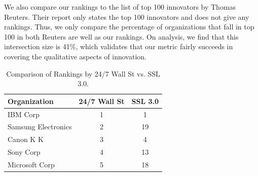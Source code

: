 We also compare our rankings to the list of top 100 innovators by Thomas
Reuters. Their report only states the top 100 innovators and does not give any
rankings. Thus, we only compare the percentage of organizations that fall in
top 100 in both Reuters are well as our rankings. On analysis, we find that
this intersection size is 41\%, which validates that our metric fairly
succeeds in covering the qualitative aspects of innovation.

\begin{table}[h]
\centering
\begin{tabular}{|l|c|c|}
\hline
\textbf{Organization}        & \multicolumn{1}{l|}{\textbf{24/7 Wall St}} & \multicolumn{1}{l|}{\textbf{SSL 3.0}} \\ \hline
IBM Corp                     & 1                                          & 1                                         \\ \hline
Samsung Electronics          & 2                                          & 19                                        \\ \hline
Canon K K                    & 3                                          & 4                                         \\ \hline
Sony Corp                    & 4                                          & 13                                        \\ \hline
Microsoft Corp               & 5                                          & 18                                        \\ \hline
\end{tabular}
\caption{Comparison of Rankings by 24/7 Wall St vs. SSL 3.0.}
\label{tab:validation}
\end{table}

